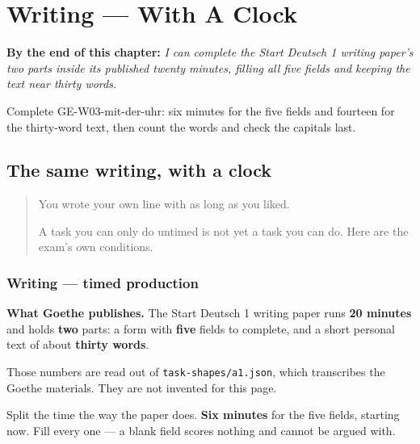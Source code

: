 
\chapter{Writing --- With A Clock}
\label{ch:ge-mit-der-uhr}

\begin{chapteropening}
\textbf{By the end of this chapter:} \emph{I can complete the Start Deutsch 1 writing paper's two parts inside its published twenty minutes, filling all five fields and keeping the text near thirty words.}

Complete GE-W03-mit-der-uhr: six minutes for the five fields and fourteen for the thirty-word text, then count the words and check the capitals last.
\end{chapteropening}

\section[(mit der Uhr)]{The same writing, with a clock}

\label{lesson:GE-W03-mit-der-uhr}



\begin{quote}
You wrote your own line with as long as you liked.

A task you can only do untimed is not yet a task you can do. Here are the exam's own conditions.
\end{quote}

\subsection*{Writing — timed production}
\textbf{What Goethe publishes.} The Start Deutsch 1 writing paper runs \textbf{20 minutes} and holds \textbf{two} parts: a form with \textbf{five} fields to complete, and a short personal text of about \textbf{thirty words}.

Those numbers are read out of \texttt{task-shapes/a1.json}, which transcribes the Goethe materials. They are not invented for this page.

Split the time the way the paper does. \textbf{Six minutes} for the five fields, starting now. Fill every one — a blank field scores nothing and cannot be argued with.

